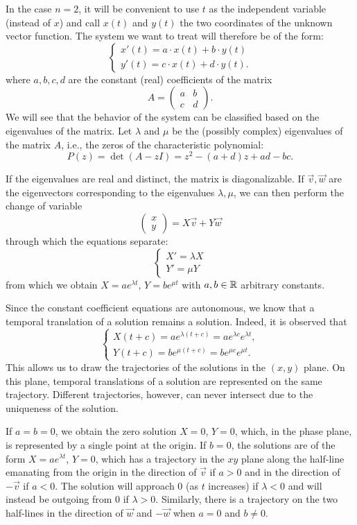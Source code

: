 In the case $n=2$, it will be convenient to use $t$ as the independent variable
(instead of $x$) and call $x(t)$ and $y(t)$ the two coordinates of the unknown
vector function. The system we want to treat will therefore be of the form:
\[
\begin{cases}
  x'(t) = a\cdot  x(t) + b \cdot y(t)\\
  y'(t) = c\cdot  x(t) + d \cdot y(t).
\end{cases}
\]
where $a,b,c,d$ are the constant (real) coefficients of the matrix
\[
   A = \begin{pmatrix}
   a & b \\
   c & d
   \end{pmatrix}.
\]
We will see that the behavior of the system can be classified based on the
eigenvalues of the matrix. Let $\lambda$ and $\mu$ be the (possibly complex)
eigenvalues of the matrix $A$, i.e., the zeros of the characteristic polynomial:
\[
 P(z)
 = \det (A - z I)
 = z^2 - (a+d) z + ad - bc.
\]

If the eigenvalues are real and distinct, the matrix is diagonalizable. If $\vec
v, \vec w$ are the eigenvectors corresponding to the eigenvalues $\lambda, \mu$,
we can then perform the change of variable
\[
\begin{pmatrix} x \\ y \end{pmatrix}
= X \vec v + Y \vec w
\]
through which the equations separate:
\[
  \begin{cases}
  X' = \lambda X \\
  Y' = \mu Y
  \end{cases}
\]
from which we obtain $X = a e^{\lambda t}$, $Y= b e^{\mu t}$ with $a,b\in {\mathbb R}$
arbitrary constants.

Since the constant coefficient equations are autonomous, we know that a temporal
translation of a solution remains a solution. Indeed, it is observed that
\[
\begin{cases}
  X(t+c) = a e^{\lambda (t+c)} = a e^{\lambda c} e^{\lambda t}, \\
  Y(t+c) = b e^{\mu (t+c)} = b e^{\mu c} e^{\mu t}.
\end{cases}
\]
This allows us to draw the trajectories of the solutions in the $(x,y)$ plane.
On this plane, temporal translations of a solution are represented on the same
trajectory. Different trajectories, however, can never intersect due to the
uniqueness of the solution.

If $a=b=0$, we obtain the zero solution $X=0$, $Y=0$, which, in the phase plane,
is represented by a single point at the origin. If $b=0$, the solutions are of
the form $X=a e^{\lambda t}$, $Y=0$, which has a trajectory in the $xy$ plane
along the half-line emanating from the origin in the direction of $\vec v$ if
$a>0$ and in the direction of $-\vec v$ if $a<0$. The solution will approach $0$
(as $t$ increases) if $\lambda<0$ and will instead be outgoing from $0$ if
$\lambda >0$. Similarly, there is a trajectory on the two half-lines in the
direction of $\vec w$ and $-\vec w$ when $a=0$ and $b\neq 0$.


